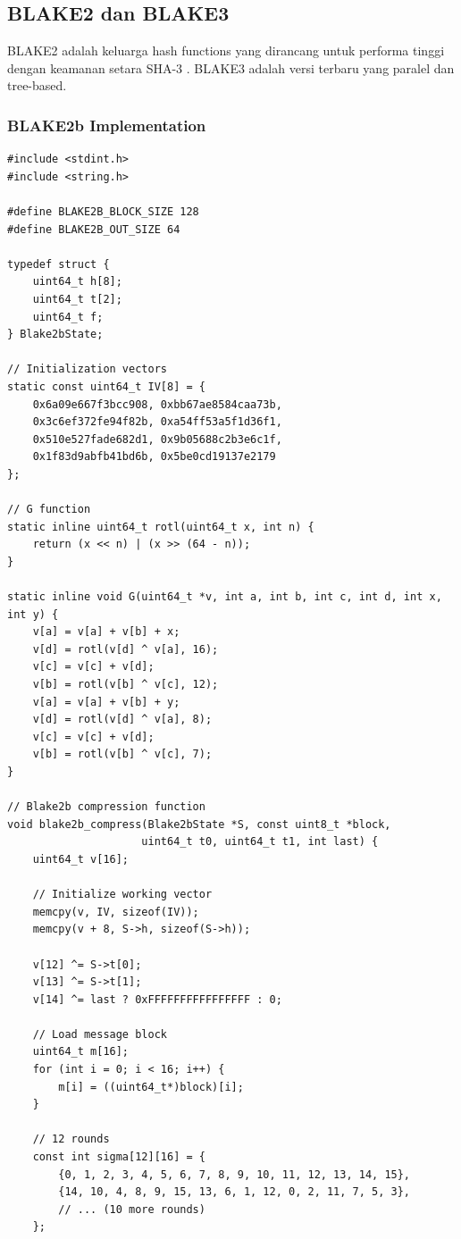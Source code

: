 \subsection{BLAKE2 dan BLAKE3}

BLAKE2 adalah keluarga hash functions yang dirancang untuk performa tinggi dengan keamanan setara SHA-3 \cite{aumasson2013}. BLAKE3 adalah versi terbaru yang paralel dan tree-based.

\subsubsection{BLAKE2b Implementation}

\begin{lstlisting}[style=cstyle, caption={BLAKE2b Compression Function}]
#include <stdint.h>
#include <string.h>

#define BLAKE2B_BLOCK_SIZE 128
#define BLAKE2B_OUT_SIZE 64

typedef struct {
    uint64_t h[8];
    uint64_t t[2];
    uint64_t f;
} Blake2bState;

// Initialization vectors
static const uint64_t IV[8] = {
    0x6a09e667f3bcc908, 0xbb67ae8584caa73b,
    0x3c6ef372fe94f82b, 0xa54ff53a5f1d36f1,
    0x510e527fade682d1, 0x9b05688c2b3e6c1f,
    0x1f83d9abfb41bd6b, 0x5be0cd19137e2179
};

// G function
static inline uint64_t rotl(uint64_t x, int n) {
    return (x << n) | (x >> (64 - n));
}

static inline void G(uint64_t *v, int a, int b, int c, int d, int x, int y) {
    v[a] = v[a] + v[b] + x;
    v[d] = rotl(v[d] ^ v[a], 16);
    v[c] = v[c] + v[d];
    v[b] = rotl(v[b] ^ v[c], 12);
    v[a] = v[a] + v[b] + y;
    v[d] = rotl(v[d] ^ v[a], 8);
    v[c] = v[c] + v[d];
    v[b] = rotl(v[b] ^ v[c], 7);
}

// Blake2b compression function
void blake2b_compress(Blake2bState *S, const uint8_t *block, 
                     uint64_t t0, uint64_t t1, int last) {
    uint64_t v[16];
    
    // Initialize working vector
    memcpy(v, IV, sizeof(IV));
    memcpy(v + 8, S->h, sizeof(S->h));
    
    v[12] ^= S->t[0];
    v[13] ^= S->t[1];
    v[14] ^= last ? 0xFFFFFFFFFFFFFFFF : 0;
    
    // Load message block
    uint64_t m[16];
    for (int i = 0; i < 16; i++) {
        m[i] = ((uint64_t*)block)[i];
    }
    
    // 12 rounds
    const int sigma[12][16] = {
        {0, 1, 2, 3, 4, 5, 6, 7, 8, 9, 10, 11, 12, 13, 14, 15},
        {14, 10, 4, 8, 9, 15, 13, 6, 1, 12, 0, 2, 11, 7, 5, 3},
        // ... (10 more rounds)
    };
    

\end{lstlisting}
